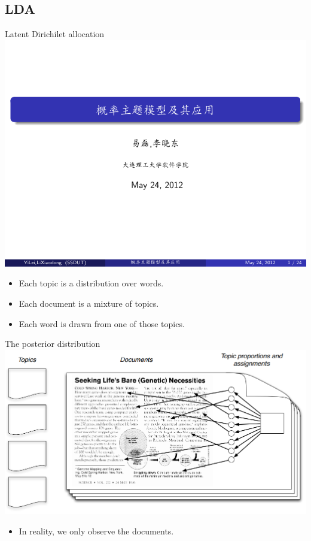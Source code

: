 \documentclass[hyperref={unicode}]{beamer}
\begin{document}
\begin{CJK}{UTF8}{gkai}
\subsection{LDA}
\begin{frame}{Latent Dirichilet allocation}
  \includegraphics[scale=0.4]{topic_model} 
  \begin{itemize}
  \item Each \alert{topic} is a distribution over words.
  \item Each \alert{document} is a mixture of topics.
  \item Each \alert{word} is drawn from one of those topics.
  \end{itemize}
\end{frame}
\begin{frame}{The posterior distribution}
  \includegraphics[scale=0.4]{posterior}
  \begin{itemize}
  \item In reality, we \alert{only observe} the documents.

\end{itemize}
\end{frame}
\end{CJK}
\end{document}
